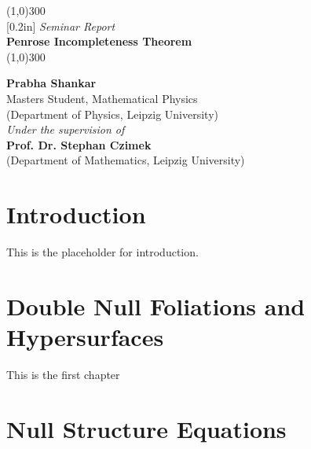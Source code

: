 \documentclass[12pt, a4paper]{report}
\theoremstyle{bfnote}
\begin{document}
\begin{titlepage}
    \begin{center}
    \line(1,0){300}\\
    [0.2in]
    \normalsize{\emph {Seminar Report}}\\	
    \Huge{\bfseries Penrose Incompleteness Theorem}\\
    [-0.12in]
    \line(1,0){300}\\
    
    \vspace{3in}
    
    \LARGE{\bfseries {Prabha Shankar}}\\
    \small{Masters Student, Mathematical Physics}\\
    \small{(Department of Physics, Leipzig University)}\\
    
    \vspace{3cm}
    \normalsize{\emph {Under the supervision of}}\\
    \large{\bfseries {Prof. Dr. Stephan Czimek}}\\
    \small{(Department of Mathematics, Leipzig University)}\\
    
    \end{center}
\end{titlepage}

\section*{Introduction}
This is the placeholder for introduction. 

\section{Double Null Foliations and Hypersurfaces}
This is the first chapter

\section{Null Structure Equations}
\end{document}
